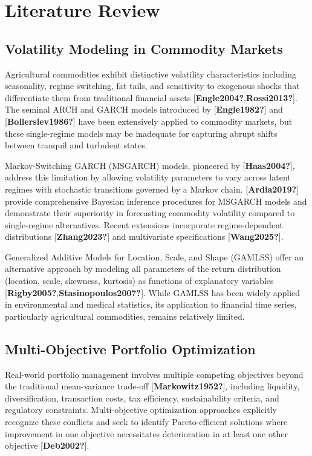 \documentclass[
  10pt,
  a4paper,
]{article}
\begin{document}
\section{Literature Review}\label{sec-literature}

\subsection{Volatility Modeling in Commodity
Markets}\label{sec-lit-volatility}

Agricultural commodities exhibit distinctive volatility characteristics
including seasonality, regime switching, fat tails, and sensitivity to
exogenous shocks that differentiate them from traditional financial
assets {[}\textbf{Engle2004?},\textbf{Rossi2013?}{]}. The seminal ARCH
and GARCH models introduced by {[}\textbf{Engle1982?}{]} and
{[}\textbf{Bollerslev1986?}{]} have been extensively applied to
commodity markets, but these single-regime models may be inadequate for
capturing abrupt shifts between tranquil and turbulent states.

Markov-Switching GARCH (MSGARCH) models, pioneered by
{[}\textbf{Haas2004?}{]}, address this limitation by allowing volatility
parameters to vary across latent regimes with stochastic transitions
governed by a Markov chain. {[}\textbf{Ardia2019?}{]} provide
comprehensive Bayesian inference procedures for MSGARCH models and
demonstrate their superiority in forecasting commodity volatility
compared to single-regime alternatives. Recent extensions incorporate
regime-dependent distributions {[}\textbf{Zhang2023?}{]} and
multivariate specifications {[}\textbf{Wang2025?}{]}.

Generalized Additive Models for Location, Scale, and Shape (GAMLSS)
offer an alternative approach by modeling all parameters of the return
distribution (location, scale, skewness, kurtosis) as functions of
explanatory variables
{[}\textbf{Rigby2005?},\textbf{Stasinopoulos2007?}{]}. While GAMLSS has
been widely applied in environmental and medical statistics, its
application to financial time series, particularly agricultural
commodities, remains relatively limited.

\subsection{Multi-Objective Portfolio Optimization}\label{sec-lit-moo}

Real-world portfolio management involves multiple competing objectives
beyond the traditional mean-variance trade-off
{[}\textbf{Markowitz1952?}{]}, including liquidity, diversification,
transaction costs, tax efficiency, sustainability criteria, and
regulatory constraints. Multi-objective optimization approaches
explicitly recognize these conflicts and seek to identify
Pareto-efficient solutions where improvement in one objective
necessitates deterioration in at least one other objective
{[}\textbf{Deb2002?}{]}.
\end{document}
